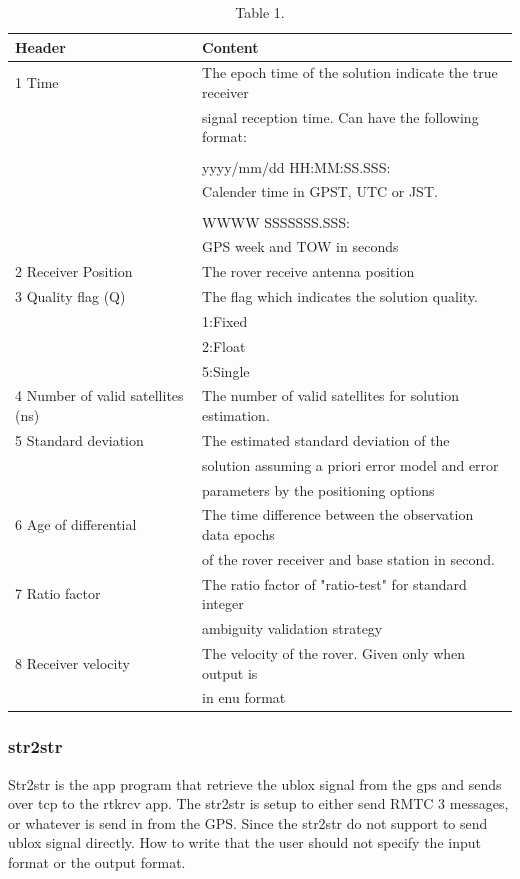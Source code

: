\begin{table}[!h]
\begin{center}
    \begin{tabular}{ | l | l |}
    \hline
    \textbf{Header} & \textbf{Content} \\ \hline
     1 Time & The epoch time of the solution indicate the true receiver\\& signal reception time. Can have the following format:\\&\\& yyyy/mm/dd HH:MM:SS.SSS:\\& Calender time in GPST, UTC or JST.\\&\\&
     
     WWWW SSSSSSS.SSS:\\&
     GPS week and TOW in seconds  \\ \hline
     2 Receiver Position & The rover receive antenna position \\ \hline
     3 Quality flag (Q) & The flag which indicates the solution quality.\\& 1:Fixed\\& 2:Float\\& 5:Single \\ \hline
     4 Number of valid satellites (ns) & The number of valid satellites for solution estimation. \\ \hline
     5 Standard deviation & The estimated standard deviation of the\\& solution assuming a priori error model and error\\& parameters by the positioning options \\ \hline
     6 Age of differential & The time difference between the observation data epochs\\& of the rover receiver and base station in second. \\ \hline
     7 Ratio factor & The ratio factor of "ratio-test" for standard integer\\& ambiguity validation strategy \\ \hline
     8 Receiver velocity & The velocity of the rover. Given only when output is\\& in enu format \\ \hline
    \end{tabular}
\end{center}
\caption{Table 1. }
\label{Tab1}
\end{table}
 
\subsubsection{str2str}
Str2str is the app program that retrieve the ublox signal from the gps and sends over tcp to the rtkrcv app. The str2str is setup to either send RMTC 3 messages, or whatever is send in from the GPS. Since the str2str do not support to send ublox signal directly. How to write that the user should not specify the input format or the output format.



\cleardoublepage